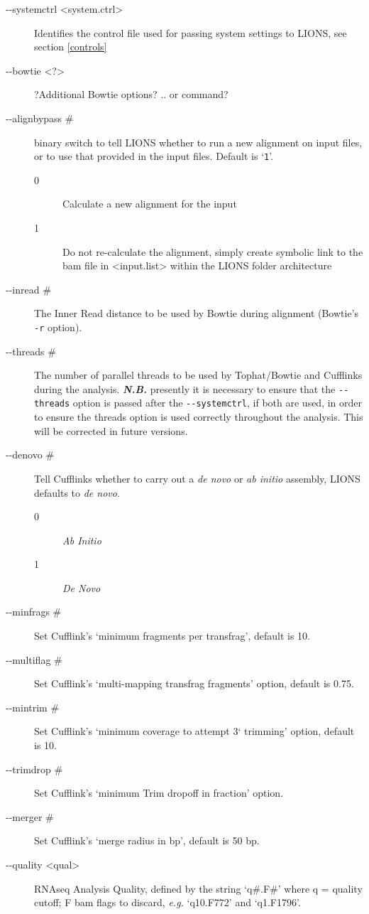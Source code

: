 \documentclass[11pt]{scrartcl}
\newcommand{\arrows}[1]{\textless #1\textgreater}
\begin{document}
\begin{description}
\item[-{}-systemctrl \arrows{system.ctrl}] Identifies the control file used for passing system settings to LIONS, see section \ref{controls} 
 
\item[-{}-bowtie \arrows{?}] ?Additional Bowtie options? .. or command?

\item[-{}-alignbypass \#] binary switch to tell LIONS whether to run a new alignment on input files, or to use that provided in the input files. Default is `\texttt{1}'.
       \begin{description}
	\item[0] Calculate a new alignment for the input
	\item[1] Do not re-calculate the alignment, simply create symbolic link to the bam file in \arrows{input.list} within the LIONS folder architecture
       \end{description}

\item[-{}-inread \#]  The Inner Read distance to be used by Bowtie during alignment (Bowtie's \texttt{-r} option). 

\item[-{}-threads \#] The number of parallel threads to be used by Tophat/Bowtie and Cufflinks during the analysis. \textbf{\textit{N.B.}} presently it is necessary to ensure that the \texttt{-{}-threads} option is passed after the \texttt{-{}-systemctrl}, if both are used, in order to ensure the threads option is used correctly throughout the analysis. This will be corrected in future versions.

\item[-{}-denovo \#] Tell Cufflinks whether to carry out a \textit{de novo} or \textit{ab initio} assembly, LIONS defaults to \textit{de novo}.
	\begin{description}
        \item[0] \textit{Ab Initio}
        \item[1] \textit{De Novo}
        \end{description}

\item[-{}-minfrags \#] Set Cufflink's `minimum fragments per transfrag', default is 10.
\item[-{}-multiflag \#] Set Cufflink's `multi-mapping transfrag fragments' option, default is 0.75.
\item[-{}-mintrim \#] Set Cufflink's `minimum coverage to attempt 3` trimming' option, default is 10.
\item[-{}-trimdrop \#] Set Cufflink's `minimum Trim dropoff in fraction' option.
\item[-{}-merger \#] Set Cufflink's `merge radius in bp', default is 50 bp.
	


\item[-{}-quality \arrows{qual}] RNAseq Analysis Quality, defined by the string `q\#.F\#' where  q = quality cutoff; F bam flags to discard, \textit{e.g.} `q10.F772' and `q1.F1796'. 


\end{description}
\end{document}
